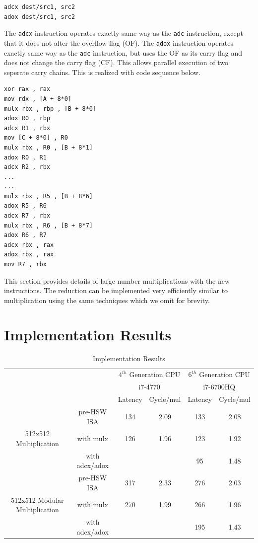 \documentclass[twocolumn]{svjour3}          %
\begin{document}
\begin{verbatim}
adcx dest/src1, src2
adox dest/src1, src2
\end{verbatim}

The \texttt{adcx} instruction operates exactly same way as the \texttt{adc} instruction, except that it does not alter the overflow flag (OF).
The \texttt{adox} instruction operates exactly same way as the \texttt{adc} instruction, but uses the OF as its carry flag and does not change the carry flag (CF). This allows parallel execution of two seperate carry chains. This is realized with code sequence below. 

\begin{verbatim}
xor rax , rax
mov rdx , [A + 8*0]
mulx rbx , rbp , [B + 8*0]
adox R0 , rbp
adcx R1 , rbx
mov [C + 8*0] , R0
mulx rbx , R0 , [B + 8*1]
adox R0 , R1
adcx R2 , rbx
...
...
mulx rbx , R5 , [B + 8*6]
adox R5 , R6
adcx R7 , rbx
mulx rbx , R6 , [B + 8*7]
adox R6 , R7
adcx rbx , rax
adox rbx , rax
mov R7 , rbx
\end{verbatim}

This section provides details of large number multiplications with the new instructions.
The reduction can be implemented very efficiently similar to multiplication using the same techniques
which we omit for brevity.

\section{Implementation Results}
\label{sec:res}

\begin{table}[ht]
\caption{Implementation Results}
\label{table:impres}
\begin{center}
\begin{tabular}{|c|c|c|c|c|c|}
\hline
\multicolumn{2}{|c|}{}	& \multicolumn{2}{c|}{$4^{th}$ Generation CPU} & \multicolumn{2}{c|}{$6^{th}$ Generation CPU} \\
\multicolumn{2}{|c|}{}	& \multicolumn{2}{c|}{i7-4770} & \multicolumn{2}{c|}{i7-6700HQ} \\
\cline{3-6}
\multicolumn{2}{|c|}{}	& Latency & Cycle/mul & Latency & Cycle/mul \\
\hline
 & pre-HSW ISA & 134 & 2.09 & 133 & 2.08 \\
\cline{2-6}
512x512 Multiplication & with mulx & 126 & 1.96 & 123 & 1.92 \\
\cline{2-6}
 & with adcx/adox &  &  & 95 & 1.48 \\
\hline
 & pre-HSW ISA & 317 & 2.33 & 276 & 2.03 \\
\cline{2-6}
512x512 Modular Multiplication & with mulx & 270 & 1.99 & 266 & 1.96 \\
\cline{2-6}
 & with adcx/adox &  &  & 195 & 1.43 \\
\hline
\end{tabular}
\end{center}
\end{table}
\end{document}
